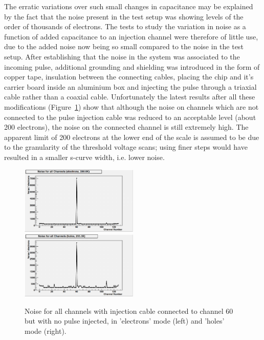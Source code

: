 The erratic variations over such small changes in capacitance may be explained by the fact that the noise
present in the test setup was showing levels of the order of thousands of electrons. The tests to study
the variation in noise as a function of added capacitance to an injection channel were therefore of little
use, due to the added noise now being so small compared to the noise in the test setup. After establishing
that the noise in the system was associated to the incoming pulse, additional grounding and shielding was
introduced in the form of copper tape, insulation between the connecting cables, placing the chip and it’s
carrier board inside an aluminium box and injecting the pulse through a triaxial cable rather than a coaxial
cable. Unfortunately the latest results after all these modifications (Figure~\ref{fig:noise_all_channels})
show that although the noise on channels which are not connected to the pulse injection cable was reduced
to an acceptable level (about 200 electrons), the noise on the connected channel is still extremely high.
The apparent limit of 200 electrons at the lower end of the scale is assumed to be due to the granularity of
the threshold voltage scans; using finer steps would have resulted in a smaller s-curve width, i.e. lower
noise.

\begin{figure}[hbtp]
   \centering
     \includegraphics[width=0.5\textwidth]{Chapters/07_Appendices/07d_ServiceWork/Images/noise_all_channels_60_connected_no_pulse_electrons}\hfill
     \includegraphics[width=0.5\textwidth]{Chapters/07_Appendices/07d_ServiceWork/Images/noise_all_channels_60_connected_no_pulse_holes}
     \caption{Noise for all channels with injection cable connected to channel 60 but with no pulse injected,
     in 'electrons' mode (left) and 'holes' mode (right).}
     \label{fig:noise_all_channels}
\end{figure}


